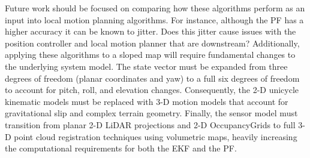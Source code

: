 Future work should be focused on comparing how these algorithms perform as an input into local motion planning algorithms.
For instance, although the PF has a higher accuracy it can be known to jitter.
Does this jitter cause issues with the position controller and local motion planner that are downstream?
Additionally, applying these algorithms to a sloped map will require fundamental changes to the underlying system model. 
The state vector must be expanded from three degrees of freedom (planar coordinates and yaw) to a full six degrees of freedom to account for pitch, roll, and elevation changes. 
Consequently, the 2-D unicycle kinematic models must be replaced with 3-D motion models that account for gravitational slip and complex terrain geometry. 
Finally, the sensor model must transition from planar 2-D LiDAR projections and 2-D OccupancyGrids to full 3-D point cloud registration techniques using volumetric maps, heavily increasing the computational requirements for both the EKF and the PF.